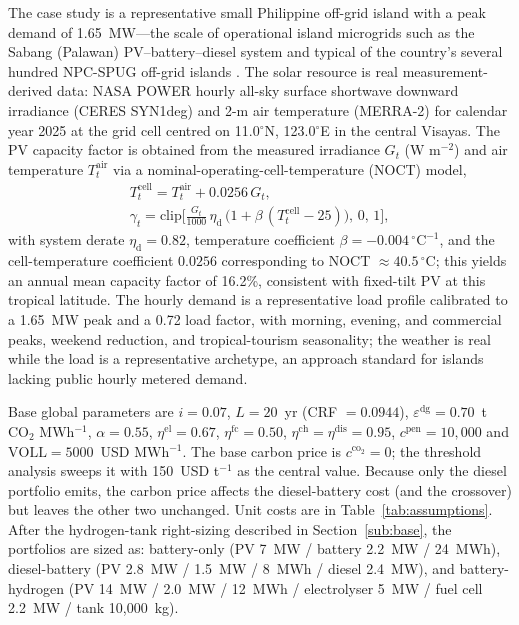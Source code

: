 \documentclass[preprint,12pt]{elsarticle}
\begin{document}
The case study is a representative small Philippine off-grid island with a peak
demand of 1.65~MW---the scale of operational island microgrids such as the Sabang
(Palawan) PV--battery--diesel system and typical of the country's several hundred
NPC-SPUG off-grid islands \cite{ocon_bertheau_2019_philippines_diesel_pvbatt,castro_2022_634_islands_hres}.
The solar resource is real measurement-derived data: NASA POWER hourly all-sky
surface shortwave downward irradiance (CERES SYN1deg) and 2-m air temperature
(MERRA-2) for calendar year 2025 at the grid cell centred on 11.0$^{\circ}$N,
123.0$^{\circ}$E in the central Visayas. The PV capacity factor is obtained from
the measured irradiance $G_t$ (W m$^{-2}$) and air temperature $T^{\mathrm{air}}_t$
via a nominal-operating-cell-temperature (NOCT) model,
\begin{equation}
\label{eq:cf}
\begin{gathered}
T^{\mathrm{cell}}_t = T^{\mathrm{air}}_t + 0.0256\,G_t, \\[2pt]
\gamma_t = \mathrm{clip}\!\Big[\tfrac{G_t}{1000}\,\eta_{\mathrm d}\,\big(1+\beta\,(T^{\mathrm{cell}}_t-25)\big),\,0,\,1\Big],
\end{gathered}
\end{equation}
with system derate $\eta_{\mathrm d}=0.82$, temperature coefficient
$\beta=-0.004\,^{\circ}\mathrm{C}^{-1}$, and the cell-temperature coefficient
$0.0256$ corresponding to NOCT $\approx 40.5\,^{\circ}\mathrm{C}$; this yields an
annual mean capacity factor of 16.2\%, consistent with fixed-tilt PV at this
tropical latitude. The hourly demand is a representative load profile calibrated to
a 1.65~MW peak and a 0.72 load factor, with morning, evening, and commercial peaks,
weekend reduction, and tropical-tourism seasonality; the weather is real while the
load is a representative archetype, an approach standard for islands lacking public
hourly metered demand.

Base global parameters are $i=0.07$, $L=20$~yr (CRF $=0.0944$),
$\varepsilon^{\mathrm{dg}}=0.70$~t CO$_2$ MWh$^{-1}$, $\alpha=0.55$,
$\eta^{\mathrm{el}}=0.67$, $\eta^{\mathrm{fc}}=0.50$,
$\eta^{\mathrm{ch}}=\eta^{\mathrm{dis}}=0.95$, $c^{\mathrm{pen}}=10{,}000$ and
$\mathrm{VOLL}=5000$~USD MWh$^{-1}$. The base carbon price is
$c^{\mathrm{co_2}}=0$; the threshold analysis sweeps it with 150~USD t$^{-1}$ as the
central value. Because only the diesel portfolio emits, the carbon price affects the
diesel-battery cost (and the crossover) but leaves the other two
unchanged. Unit costs are in Table~\ref{tab:assumptions}. After the hydrogen-tank
right-sizing described in Section~\ref{sub:base}, the portfolios are sized as:
battery-only (PV 7~MW / battery 2.2~MW / 24~MWh), diesel-battery
(PV 2.8~MW / 1.5~MW / 8~MWh / diesel 2.4~MW), and battery-hydrogen (PV
14~MW / 2.0~MW / 12~MWh / electrolyser 5~MW / fuel cell 2.2~MW / tank 10{,}000~kg).
\end{document}
